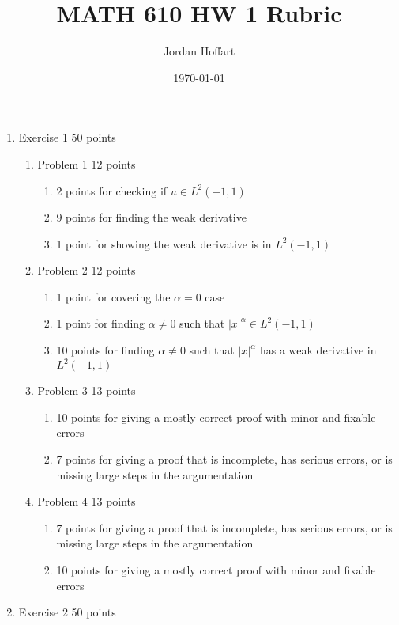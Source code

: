\documentclass{article}
\title{MATH 610 HW 1 Rubric}
\author{Jordan Hoffart}
\date{\today}
\begin{document}
\maketitle

\begin{enumerate}
  \item Exercise 1 50 points
    \begin{enumerate}
      \item Problem 1 12 points
        \begin{enumerate}
          \item 2 points for checking if $u \in L^2(-1,1)$
          \item 9 points for finding the weak derivative
          \item 1 point for showing the weak derivative is in $L^2(-1,1)$
        \end{enumerate}
      \item Problem 2 12 points
        \begin{enumerate}
          \item 1 point for covering the $\alpha = 0$ case
          \item 1 point for finding $\alpha \neq 0$ such that $|x|^\alpha \in L^2(-1,1)$
          \item 10 points for finding $\alpha \neq 0$ such that $|x|^\alpha$ has a weak derivative in $L^2(-1,1)$
        \end{enumerate}
      \item Problem 3 13 points
        \begin{enumerate}
          \item 10 points for giving a mostly correct proof with minor and fixable errors
          \item 7 points for giving a proof that is incomplete, has serious errors, or is missing large steps in the argumentation
        \end{enumerate}
      \item Problem 4 13 points
        \begin{enumerate}
          \item 7 points for giving a proof that is incomplete, has serious errors, or is missing large steps in the argumentation
          \item 10 points for giving a mostly correct proof with minor and fixable errors
        \end{enumerate}
    \end{enumerate}
  \item Exercise 2 50 points

\end{enumerate}
\end{document}
